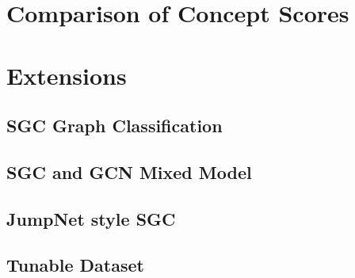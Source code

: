\section{Comparison of Concept Scores}

\section{Extensions}

\subsection{SGC Graph Classification}

\subsection{SGC and GCN Mixed Model}

\subsection{JumpNet style SGC}

\subsection{Tunable Dataset}
